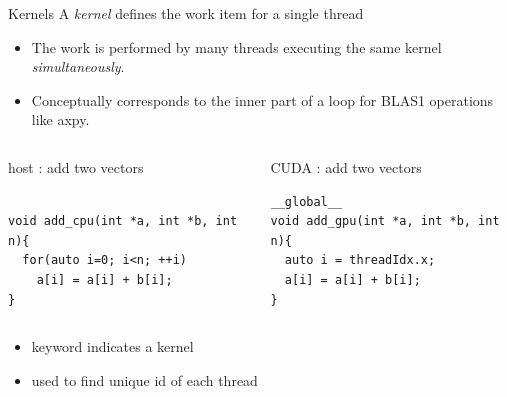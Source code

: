 \documentclass[aspectratio=43]{beamer}
\newcommand{\axpy}{{\ttfamily axpy}\xspace}
\begin{document}
\begin{frame}[fragile]{Kernels}
    A \emph{kernel} defines the work item for a single thread
    \begin{itemize}
        \item The work is performed by many threads executing the same kernel \emph{simultaneously}.
        \item Conceptually corresponds to the inner part of a loop for BLAS1 operations like \axpy.
    \end{itemize}

    \vspace{-10pt}
    \begin{columns}[T]
        \begin{column}{0.5\textwidth}
            \begin{codecolumn}{host : add two vectors}
        \begin{lstlisting}[style=boxcudatiny]

void add_cpu(int *a, int *b, int n){
  for(auto i=0; i<n; ++i)
    a[i] = a[i] + b[i];
}
        \end{lstlisting}
            \end{codecolumn}
        \end{column}
        \begin{column}{0.5\textwidth}
            \begin{codecolumn}{CUDA : add two vectors}
        \begin{lstlisting}[style=boxcudatiny]
__global__
void add_gpu(int *a, int *b, int n){
  auto i = threadIdx.x;
  a[i] = a[i] + b[i];
}
        \end{lstlisting}
            \end{codecolumn}
        \end{column}
    \end{columns}

    \vspace{-2pt}
    \begin{info}{}
    \begin{itemize}
        \item {} keyword indicates a kernel
        \item {} used to find unique id of each thread
    \end{itemize}
    \end{info}
\end{frame}
\end{document}
